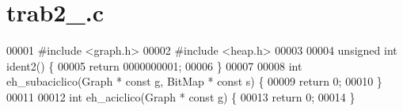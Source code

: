 \section{trab2\+\_.\+c}
\label{trab2__0000000001_8c_source}

\begin{DoxyCode}
00001 \textcolor{preprocessor}{#include <graph.h>}
00002 \textcolor{preprocessor}{#include <heap.h>}
00003 
00004 \textcolor{keywordtype}{unsigned} \textcolor{keywordtype}{int} ident2() \{
00005         \textcolor{keywordflow}{return} 0000000001;
00006 \}
00007 
00008 \textcolor{keywordtype}{int} eh_subaciclico(Graph * \textcolor{keyword}{const} g, BitMap * \textcolor{keyword}{const} s) \{
00009         \textcolor{keywordflow}{return} 0;
00010 \}
00011 
00012 \textcolor{keywordtype}{int} eh_aciclico(Graph * \textcolor{keyword}{const} g) \{
00013         \textcolor{keywordflow}{return} 0;
00014 \}
\end{DoxyCode}
